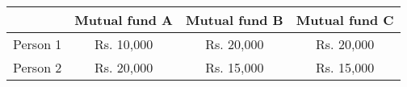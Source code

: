 \begin{center}
\begin{tabular}{|c|c|c|c|}
\hline
        & Mutual fund A & Mutual fund B & Mutual fund C \\
\hline
Person 1 & Rs. 10,000 & Rs. 20,000 & Rs. 20,000 \\
Person 2 & Rs. 20,000 & Rs. 15,000 & Rs. 15,000 \\
\hline
\end{tabular}
\end{center}